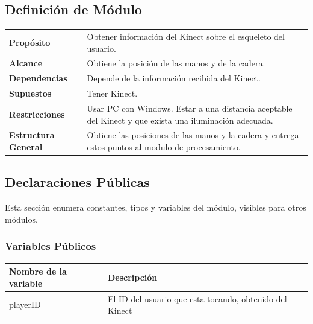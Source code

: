 \documentclass[a4paper,10pt]{article}
\begin{document}
\subsection{Definición de Módulo}
\begin{tabularx}{\textwidth}{p{25mm} X}
        \textbf{Propósito} & Obtener información del Kinect sobre el esqueleto del usuario.\\
        \textbf{Alcance} & Obtiene la posición de las manos y de la cadera.\\
        \textbf{Dependencias} & Depende de la información recibida del Kinect.\\
        \textbf{Supuestos} & Tener Kinect. \\
        \textbf{Restricciones} & Usar PC con Windows. Estar a una distancia aceptable del Kinect y que exista una iluminación adecuada.\\
        \textbf{Estructura General} & Obtiene las posiciones de las manos y la cadera y entrega estos puntos al modulo de procesamiento.\\
\end{tabularx}
\subsection{Declaraciones Públicas}
Esta sección enumera constantes, tipos y variables del módulo, visibles para
otros módulos.
                

\subsubsection{Variables Públicos}
\begin{tabular}{| p{30mm} | p{10cm} |}
        \hline
        \textbf{Nombre de la \mbox{variable}} & \textbf{Descripción} \\
        \hline
        playerID & El ID del usuario que esta tocando, obtenido del Kinect \\
        \hline
\end{tabular}
\end{document}
